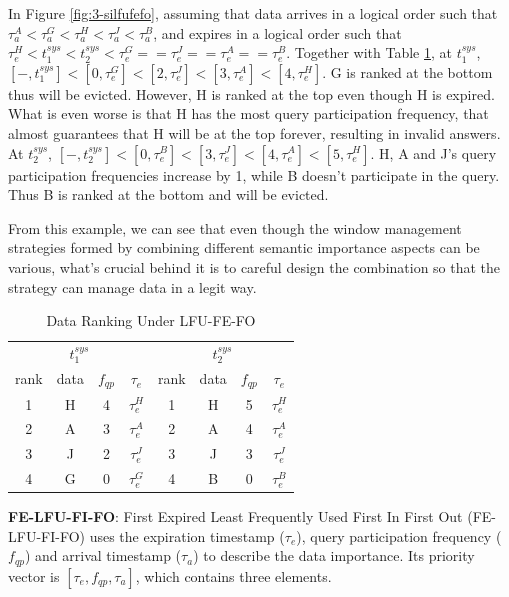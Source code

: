 In Figure \ref{fig:3-silfufefo}, assuming that data arrives in a logical order such that $\tau^{A}_{a} < \tau^{G}_{a} < \tau^{H}_{a} < \tau^{J}_{a} < \tau^{B}_{a}$, and expires in a logical order such that $\tau^{H}_{e} < t^{sys}_{1} < t^{sys}_{2} < \tau^{G}_{e} == \tau^{J}_{e} == \tau^{A}_{e} == \tau^{B}_{e}$. 
Together with Table \ref{tab:lfufefo}, at $t^{sys}_{1}$, $[-, t^{sys}_{1}] < [0, \tau^{G}_{e}] < [2, \tau^{J}_{e}] < [3, \tau^{A}_{e}] < [4, \tau^{H}_{e}]$. 
G is ranked at the bottom thus will be evicted.
However, H is ranked at the top even though H is expired. 
What is even worse is that H has the most query participation frequency, that almost guarantees that H will be at the top forever, resulting in invalid answers.
At $t^{sys}_{2}$, $[-, t^{sys}_{2}] < [0, \tau^{B}_{e}] < [3, \tau^{J}_{e}] < [4, \tau^{A}_{e}] < [5, \tau^{H}_{e}]$.
H, A and J's query participation frequencies increase by 1, while B doesn't participate in the query.
Thus B is ranked at the bottom and will be evicted. 

From this example, we can see that even though the window management strategies formed by combining different semantic importance aspects can be various, what's crucial behind it is to careful design the combination so that the strategy can manage data in a legit way. 

\begin{table}[!htbp]
\centering
\caption{Data Ranking Under LFU-FE-FO}
\label{tab:lfufefo}
\begin{tabular}{|c|c|c|c||c|c|c|c|}
\hline
\multicolumn{4}{|c||}{$t^{sys}_{1}$} & \multicolumn{4}{c|}{$t^{sys}_{2}$} \\ \hhline{|====#====|}
rank & data & $f_{qp}$ & $\tau_{e}$ & rank & data & $f_{qp}$ & $\tau_{e}$ \\ \hhline{|=|=|=|=#=|=|=|=|}
1 & H & 4 & $\tau^{H}_{e}$ & 1 & H & 5 & $\tau^{H}_{e}$ \\ \hline
2 & A & 3 & $\tau^{A}_{e}$ & 2 & A & 4 & $\tau^{A}_{e}$ \\ \hline
3 & J & 2 & $\tau^{J}_{e}$ & 3 & J & 3 & $\tau^{J}_{e}$ \\ \hline
4 & G & 0 & $\tau^{G}_{e}$ & 4 & B & 0 & $\tau^{B}_{e}$ \\ \hline
\end{tabular}
\end{table}

\textbf{FE-LFU-FI-FO}:
First Expired Least Frequently Used First In First Out (FE-LFU-FI-FO) uses the expiration timestamp ($\tau_{e}$), query participation frequency ($f_{qp}$) and arrival timestamp ($\tau_{a}$) to describe the data importance.
Its priority vector is $[\tau_{e}, f_{qp}, \tau_{a}]$, which contains three elements.

